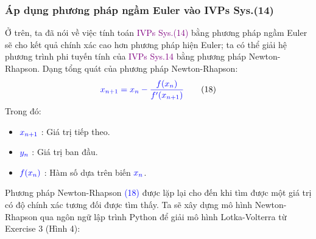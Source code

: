 \documentclass[a4paper]{article}
\begin{document}
    \subsubsection{Áp dụng phương pháp ngầm Euler vào IVPs Sys.(14)}
        Ở trên, ta đã nói về việc tính toán \textcolor{purple}{IVPs Sys.(14)} bằng phương pháp ngầm Euler sẽ cho kết quả chính xác cao hơn phương pháp hiện Euler; ta có thể giải hệ phương trình phi tuyến tính của \textcolor{purple}{IVPs Sys.14} bằng phương pháp Newton-Rhapson. 
        Dạng tổng quát của phương pháp Newton-Rhapson:
        \begin{align} 
         \textcolor{blue}{x_{n+1}= x_{n} - \dfrac{f(x_{n})}{f'(x_{n+1})} } \tag{18}
        \end{align}
        Trong đó:
    \begin{itemize}
        \item $\textcolor{blue}{x_{n+1}}$ : Giá trị tiếp theo.
        \item $\textcolor{blue}{y_{n}}$ : Giá trị ban đầu.
        \item $\textcolor{blue}{f(x_{n})}$ : Hàm số dựa trên biến $\textcolor{blue}{x_{n}}$.
    \end{itemize}
    Phương pháp Newton-Rhapson \textcolor{blue}{(18)} được lặp lại cho đến khi tìm được một giá trị có độ chính xác tương đối được tìm thấy. 
    Ta sẽ xây dựng mô hình Newton-Rhapson qua ngôn ngữ lập trình Python để giải mô hình Lotka-Volterra từ Exercise 3 (Hình 4):
\end{document}

